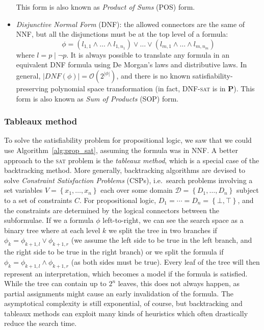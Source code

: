 \documentclass{article}
\theoremstyle{example}
\theoremstyle{remark}
\newcommand{\BigO}{\mathcal{O}}
\newcommand{\abs}[1]{\left\lvert{#1}\right\rvert}
\begin{document}
\begin{itemize}
	      This form is also known as \emph{Product of Sums} (POS) form.
	\item \emph{Disjunctive Normal Form} (DNF): the allowed connectors are the same of NNF, but
	      all the disjunctions must be at the top level of a formula:
	      \[\phi = \left(l_{1,1} \land \dots \land l_{1,n_1}\right) \lor \dots \lor \left(l_{m,1}
		      \land \dots \land l_{m,n_m}\right)\]
	      where \(l = p \mid \neg p\).
	      It is always possible to translate any formula in an equivalent DNF formula using
	      De Morgan's laws and distributive laws.
	      In general, \(\abs{DNF\left(\phi\right)} = \BigO\left(2^{\abs{\phi}}\right)\),
	      and there is no known satisfiability-preserving polynomial space transformation
	      (in fact, \textsc{DNF-sat} is in \textbf{P}).
	      This form is also known as \emph{Sum of Products} (SOP) form.
\end{itemize}

\subsubsection{Tableaux method}
To solve the satisfiability problem for propositional logic, we saw that we could use
Algorithm~\ref{alg:prop_sat}, assuming the formula was in NNF\@.
A better approach to the \textsc{sat} problem is the \emph{tableaux method}, which is a special
case of the backtracking method.
More generally, backtracking algorithms are devised to solve \emph{Constraint Satisfaction Problems}
(CSPs), i.e.\ search problems involving a  set variables \(V = \left\{x_1, \dots, x_n \right\} \)
each over some domain \(\mathcal{D} = \left\{D_1, \dots, D_n \right\} \) subject to a set of
constraints \(C\).
For propositional logic, \(D_1 = \cdots = D_n = \left\{\bot, \top \right\} \), and the constraints
are determined by the logical connectors between the subformulae.
If we a formula \(\phi \) left-to-right, we can see the search space as a binary tree where at each
level \(k\) we split the tree in two branches if \(\phi_k = \phi_{k+1,l} \lor \phi_{k+1,r} \) (we
assume the left side to be true in the left branch, and the right side to be true in the right branch)
or we split the formula if \(\phi_k = \phi_{k+1,l} \land \phi_{k+1,r} \)
(as both sides must be true).
Every leaf of the tree will then represent an interpretation, which becomes a model if the
formula is satisfied.
While the tree can contain up to \(2^n\) leaves, this does not always happen, as partial assignments
might cause an early invalidation of the formula.
The asymptotical complexity is still exponential, of course, but backtracking and tableaux methods
can exploit many kinds of heuristics which often drastically reduce the search time.
\end{document}
